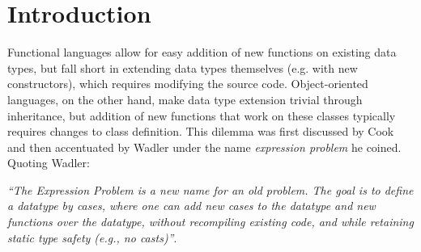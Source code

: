 \documentclass[preprint]{sigplanconf}
\begin{document}
\section{Introduction} %
\label{sec:intro}





Functional languages allow for easy addition of new functions on existing data 
types, but fall short in extending data types themselves (e.g. with new constructors), 
which requires modifying the source code. Object-oriented languages, on the 
other hand, make data type extension trivial through inheritance, but addition 
of new functions that work on these classes typically requires changes to class 
definition. This dilemma was first discussed by Cook\cite{Cook90} and then 
accentuated by Wadler\cite{exprproblem} under the name \emph{expression problem} 
he coined. Quoting Wadler:

\emph{``The Expression Problem is a new name for an old problem. The goal is
to define a datatype by cases, where one can add new cases to the
datatype and new functions over the datatype, without recompiling
existing code, and while retaining static type safety (e.g., no
casts)''}.
\end{document}
